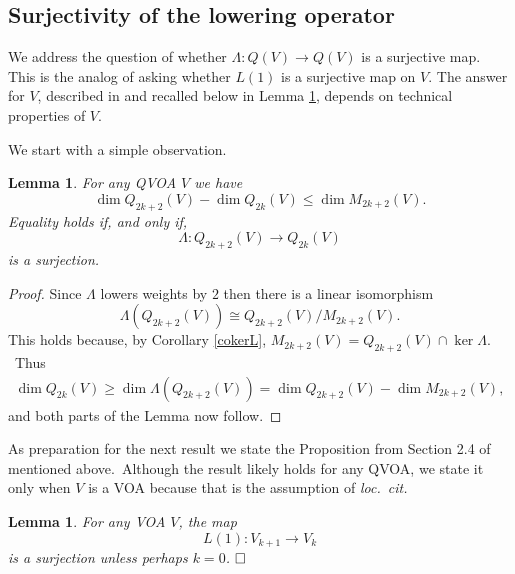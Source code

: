 \documentclass[12pt]{amsart}
\theoremstyle{plain}
\newtheorem{lem}[thm]{Lemma}
\theoremstyle{definition}
\theoremstyle{remark}
\begin{document}
\subsection{Surjectivity of the lowering operator}
We address the question of whether $\Lambda:Q(V)\rightarrow Q(V)$ is a surjective map. This is the analog of asking whether $L(1)$ is a surjective map on $V$. The answer for $V$, described in \cite{DLMsl2} and recalled below in Lemma \ref{lemL1surj}, depends on technical properties of $V$.

\medskip
We start with a simple observation.
\begin{lem}\label{lemineq} For any QVOA $V$ we  have
$$\dim Q_{2k+2}(V)-\dim Q_{2k}(V) \leq \dim M_{2k+2}(V).$$
Equality holds if, and only if,
$$\Lambda:Q_{2k+2}(V)\rightarrow Q_{2k}(V)$$
is a surjection.
\end{lem}
\begin{proof}
  Since $\Lambda$ lowers weights by $2$ then there is a linear isomorphism
  $$\Lambda(Q_{2k+2}(V))\cong Q_{2k+2}(V)/M_{2k+2}(V).$$
  This holds because, by Corollary \ref{cokerL}, $M_{2k+2}(V)=Q_{2k+2}(V)\cap \ker\Lambda.$\ Thus
  \begin{eqnarray*}
   \dim Q_{2k}(V)\geq \dim \Lambda(Q_{2k+2}(V))=\dim Q_{2k+2}(V)-\dim M_{2k+2}(V),   
  \end{eqnarray*}
  and both parts of the Lemma now follow.
\end{proof}

As preparation for the next result we state the Proposition from Section 2.4 of \cite{DLMsl2} mentioned above.\ Although the result likely holds for any QVOA, we state it only when $V$ is a VOA because that is the assumption of  \textit{loc.\ cit.}
\begin{lem}\label{lemL1surj} For any VOA $V$, the map
$$L(1): V_{k+1}\rightarrow V_k$$
is a \textit{surjection} unless perhaps $k=0$.
$\hfill \Box$
\end{lem}
\end{document}
